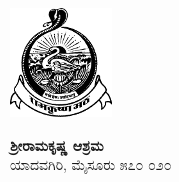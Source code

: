 \thispagestyle{empty}



\begin{center}
\includegraphics{"images/logo.png"}
\end{center}

\textbf{ಶ್ರೀರಾಮಕೃಷ್ಣ ಆಶ್ರಮ}\\ಯಾದವಗಿರಿ, ಮೈಸೂರು ೫೭೦ ೦೨೦

